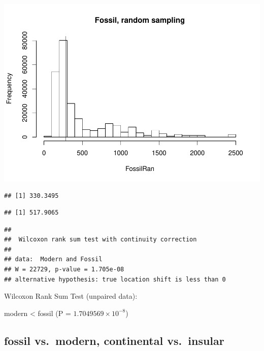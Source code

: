 \documentclass[]{article}
\begin{document}
\includegraphics{MA_JJ_files/figure-latex/randon sampling modern fossil-1.pdf}

\begin{verbatim}
## [1] 330.3495
\end{verbatim}

\begin{verbatim}
## [1] 517.9065
\end{verbatim}

\begin{verbatim}
## 
##  Wilcoxon rank sum test with continuity correction
## 
## data:  Modern and Fossil
## W = 22729, p-value = 1.705e-08
## alternative hypothesis: true location shift is less than 0
\end{verbatim}

Wilcoxon Rank Sum Test (unpaired data):

modern \textless{} fossil (P = \(1.7049569\times 10^{-8}\))

\newpage

\subsection{fossil vs.~modern, continental
vs.~insular}\label{fossil-vs.modern-continental-vs.insular}
\end{document}
